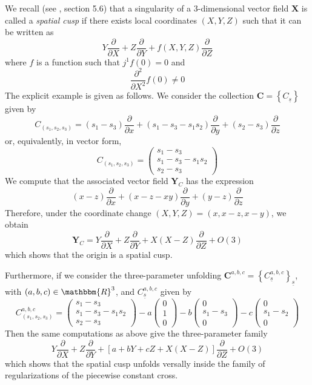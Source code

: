 \documentclass[11pt,psamsfonts]{article}
\newcommand{\tmem}[1]{{\em #1\/}}
\newcommand{\tmmathbf}[1]{\ensuremath{\boldsymbol{#1}}}
\theoremstyle{definition}
\theoremstyle{remark}
\newcommand{\cR}{\ensuremath{\mathbbm{R}}}
\newcommand{\us}{\underline{s}}
\begin{document}
We recall (see \cite{BIRR}, section
5.6) that a singularity of a 3-dimensional vector field $\tmmathbf{X}$ is
called a {\tmem{spatial cusp}} if there exists local coordinates $(X, Y, Z)$
such that it can be written as
\[ Y \frac{\partial}{\partial X} + Z \frac{\partial}{\partial Y} + f (X, Y,
   Z) \frac{\partial}{\partial Z} \]
where $f$ is a function such that $j^1 f (0) = 0$ and
\[ \frac{\partial^2}{\partial X ^2} f (0) \neq 0 \]
The explicit example is given as follows. We consider the collection
$\tmmathbf{C} = \left\{ C_{\us} \right\}$ given by
\[ C_{(s_1, s_2, s_3)} = (s_1 - s_3) \frac{\partial}{\partial x} + (s_1 - s_3
   - s_1 s_2) \frac{\partial}{\partial y} + (s_2 - s_3)
   \frac{\partial}{\partial z} \]
or, equivalently, in vector form,
\[ C_{(s_1, s_2, s_3)} = \left(\begin{array}{c}
     s_1 - s_3\\
     s_1 - s_3 - s_1 s_2\\
     s_2 - s_3
   \end{array}\right) \]
We compute that the associated vector field $\tmmathbf{Y}_C$ has the
expression
\[ (x - z) \frac{\partial}{\partial x} + (x - z - x y)
   \frac{\partial}{\partial y} + (y - z) \frac{\partial}{\partial z} \]
Therefore, under the coordinate change $(X, Y, Z) = (x, x - z, x - y)$, we
obtain
\[ \tmmathbf{Y}_C = Y \frac{\partial}{\partial X} + Z \frac{\partial}{\partial Y} + X (X
   - Z) \frac{\partial}{\partial Z} + O (3) \]
which shows that the origin is a spatial cusp.

Furthermore, if we consider the three-parameter unfolding $\tmmathbf{C}^{a,
b, c} = \left\{ C_{\us}^{a, b, c} \right\}_{\us}$, with $(a, b, c) \in
\cR^3$, and $C_{\us}^{a, b, c}$ given by
\[ C^{a, b, c}_{(s_1, s_2, s_3)} = \left(\begin{array}{c}
     s_1 - s_3\\
     s_1 - s_3 - s_1 s_2\\
     s_2 - s_3
   \end{array}\right) - a \left(\begin{array}{c}
     0\\
     1\\
     0
   \end{array}\right) - b \left(\begin{array}{c}
     0\\
     s_1 - s_3\\
     0
   \end{array}\right) - c \left(\begin{array}{c}
     0\\
     s_1 - s_2\\
     0
   \end{array}\right) \]
Then the same computations as above give the three-parameter family
\[ Y \frac{\partial}{\partial X} + Z \frac{\partial}{\partial Y} + [a + b Y +
   c Z + X (X - Z)] \frac{\partial}{\partial Z} + O (3) \]
which shows that the spatial cusp unfolds versally inside the family of
regularizations of the piecewise constant cross. \
\end{document}

